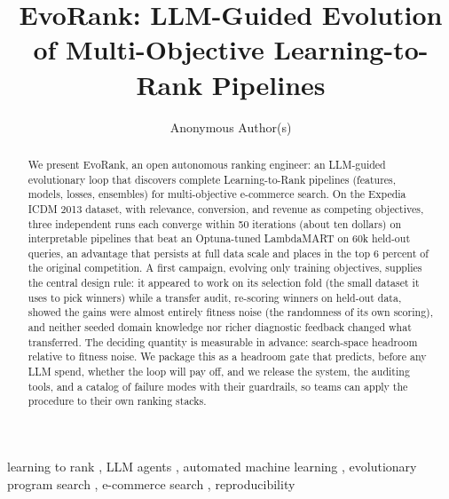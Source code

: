 \documentclass[]{ceurart}
\begin{document}


\title{EvoRank: LLM-Guided Evolution of Multi-Objective Learning-to-Rank Pipelines}
\tnotemark[1]

\author[1]{Anonymous Author(s)}
\address[1]{Anonymized for double-blind review}

\begin{abstract}
We present EvoRank, an open autonomous ranking engineer: an LLM-guided
evolutionary loop that discovers complete Learning-to-Rank pipelines
(features, models, losses, ensembles) for multi-objective e-commerce
search. On the Expedia ICDM 2013 dataset, with
relevance, conversion, and revenue as competing objectives, three independent runs each converge within 50 iterations (about ten dollars) on interpretable pipelines
that beat an Optuna-tuned LambdaMART on 60k held-out queries, an advantage that persists at full data scale and places in the top 6
percent of the original competition. A first campaign, evolving only training objectives, supplies the central
design rule: it appeared to work on its selection fold (the small dataset it uses to
pick winners) while a transfer audit, re-scoring winners on held-out data,
showed the gains were almost entirely fitness noise (the randomness of its
own scoring), and neither seeded domain knowledge nor richer diagnostic
feedback changed what transferred. The deciding quantity is
measurable in advance: search-space headroom relative to fitness noise. We
package this as a headroom gate that predicts, before any LLM spend, whether
the loop will pay off, and we release the system, the auditing tools, and a catalog of failure
modes with their guardrails, so teams can apply the procedure to their own ranking stacks.
\end{abstract}

\begin{keywords}
  learning to rank \sep
  LLM agents \sep
  automated machine learning \sep
  evolutionary program search \sep
  e-commerce search \sep
  reproducibility
\end{keywords}
\end{document}
